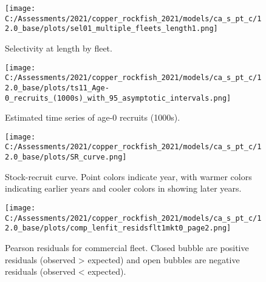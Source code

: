 \documentclass[11pt,
  english,
  a4paper,
]{article}
\begin{document}
\tagmcend\tagstructend


\begin{figure}
\centering
\texttt{[image: C:/Assessments/2021/copper\_rockfish\_2021/models/ca\_s\_pt\_c/12.0\_base/plots/sel01\_multiple\_fleets\_length1.png]}
\caption{Selectivity at length by fleet.\label{fig:selex}}
\end{figure}

\tagmcend\tagstructend


\begin{figure}
\centering
\texttt{[image: C:/Assessments/2021/copper\_rockfish\_2021/models/ca\_s\_pt\_c/12.0\_base/plots/ts11\_Age-0\_recruits\_(1000s)\_with\_95\_asymptotic\_intervals.png]}
\caption{Estimated time series of age-0 recruits (1000s).\label{fig:recruits}}
\end{figure}

\tagmcend\tagstructend


\begin{figure}
\centering
\texttt{[image: C:/Assessments/2021/copper\_rockfish\_2021/models/ca\_s\_pt\_c/12.0\_base/plots/SR\_curve.png]}
\caption{Stock-recruit curve. Point colors indicate year, with warmer colors indicating earlier years and cooler colors in showing later years.\label{fig:bh-curve}}
\end{figure}

\tagmcend\tagstructend


\begin{figure}
\centering
\texttt{[image: C:/Assessments/2021/copper\_rockfish\_2021/models/ca\_s\_pt\_c/12.0\_base/plots/comp\_lenfit\_residsflt1mkt0\_page2.png]}
\caption{Pearson residuals for commercial fleet. Closed bubble are positive residuals (observed \textgreater{} expected) and open bubbles are negative residuals (observed \textless{} expected).\label{fig:com-pearson}}
\end{figure}
\end{document}
